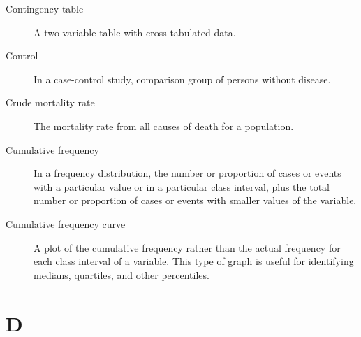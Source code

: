 \documentclass[11pt]{article}
\begin{document}
\begin{description}
\item[Contingency table] A two-variable table with
cross-tabulated data.
\item[Control] In a case-control study, comparison group of
persons without disease.
\item[Crude mortality rate] The mortality rate from all causes of
death for a population.
\item[Cumulative frequency] In a frequency distribution, the
number or proportion of cases or events with a particular value
or in a particular class interval, plus the total number or
proportion of cases or events with smaller values of the
variable.
\item[Cumulative frequency curve] A plot of the cumulative
frequency rather than the actual frequency for each class
interval of a variable. This type of graph is useful for
identifying medians, quartiles, and other percentiles.
\end{description}

\section*{D}
\end{document}
